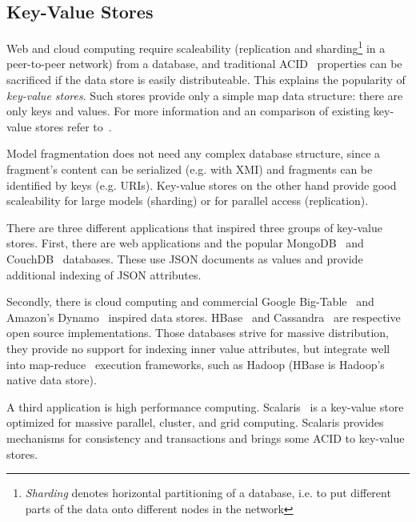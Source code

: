 \subsection{Key-Value Stores}

Web and cloud computing require scaleability (replication and sharding\footnote{\emph{Sharding} denotes horizontal partitioning of a database, i.e. to put different parts of the data onto different nodes in the network} in a peer-to-peer network) from a database, and traditional ACID~\cite{ACID} properties can be sacrificed if the data store is easily distributeable. This explains the popularity of \emph{key-value stores}. Such stores provide only a simple map data structure: there are only keys and values. For more information and an comparison of existing key-value stores refer to~\cite{nosql2010}.

Model fragmentation does not need any complex database structure, since a fragment's content can be serialized (e.g. with XMI) and fragments can be identified by keys (e.g. URIs). Key-value stores on the other hand provide good scaleability for  large models (sharding) or for parallel access (replication).

There are three different applications that inspired three groups of key-value stores. First, there are web applications and the popular MongoDB~\cite{mongodb2010} and CouchDB~\cite{couchdb2010} databases. These use JSON documents as values and provide additional indexing of JSON attributes.

Secondly, there is cloud computing and commercial Google Big-Table~\cite{bigtable2006} and Amazon's Dynamo~\cite{dynamo2007} inspired data stores. HBase~\cite{hbase2008} and Cassandra~\cite{cassandra2009} are respective open source implementations. Those databases strive for massive distribution, they provide no support for indexing inner value attributes, but integrate well into map-reduce~\cite{mapreduce} execution frameworks, such as Hadoop (HBase is Hadoop's native data store). 

A third application is high performance computing. Scalaris~\cite{ScalarisTransactions2008} is a key-value store optimized for massive parallel, cluster, and grid computing. Scalaris provides mechanisms for consistency and transactions and brings some ACID to key-value stores.